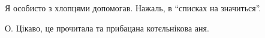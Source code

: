 
 
 
 
 

\qqSecCmt


Я особисто з хлопцями допомогав. Нажаль, в \enquote{списках на значиться}.


О. Цікаво, це прочитала та прибацана котєльнікова аня.
